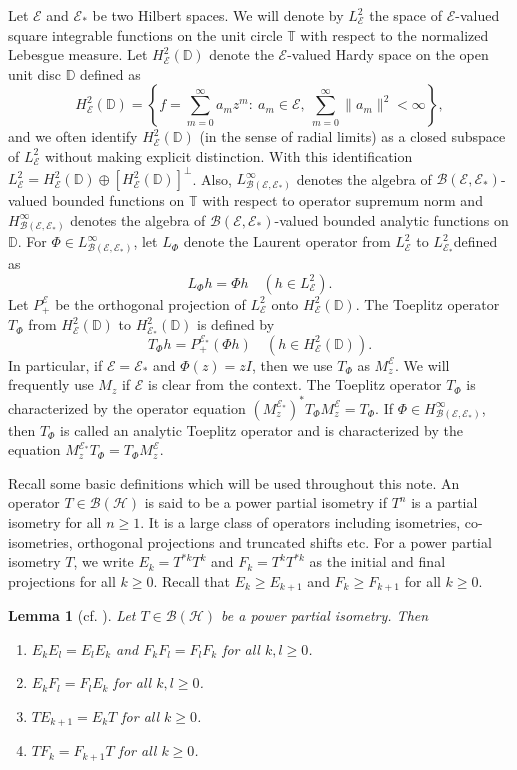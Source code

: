 \documentclass[12pt]{amsart}
\newcommand{\clb}{\mathcal{B}}
\newcommand{\cle}{\mathcal{E}}
\newcommand{\D}{\mathbb{D}}
\newcommand{\T}{\mathbb{T}}
\theoremstyle{definition}
\theoremstyle{plain}
\newtheorem{lem}[thm]{Lemma}
\theoremstyle{definition}
\numberwithin{equation}{section}
\begin{document}
Let $\cle$ and $\cle_*$ be two Hilbert spaces. We will denote by $L^2_\cle$  the space of $\cle$-valued square integrable functions on the unit circle $\T$ with respect to the normalized Lebesgue measure. Let $H^2_{\cle}(\D)$ denote the $\cle$-valued Hardy space on the open unit disc $\D$ defined as 
\[
H^2_{\cle}(\D) = \left\{ f=\sum\limits_{m=0}^\infty a_mz^m:\ a_m \in \cle,\  \sum\limits_{m=0}^\infty \|a_m\|^2 <\infty \right\},
\]
and we often identify $H^2_{\cle}(\D)$ (in the sense of radial limits) as a closed subspace of $L^2_\cle$ without making explicit distinction. With this identification $L^2_\cle = H^2_{\cle}(\D) \oplus [H^2_{\cle}(\D)]^{\perp}$. 
Also, $L^\infty_{\clb(\cle,\cle_*)}$  denotes  the algebra of $\clb(\cle,\cle_*)$-valued  bounded functions on $\T$ with respect to operator supremum norm and $H^\infty_{\clb(\cle,\cle_*)}$ denotes the algebra of $\clb(\cle,\cle_*)$-valued bounded analytic functions on $\D$. For $\Phi \in L^\infty_{\clb(\cle,\cle_*)}$, let $L_\Phi$ denote the  Laurent operator  from $L^2_\cle$ to $L^2_{\cle_*}$defined as
\[
L_\Phi h= \Phi h \quad (h \in L^2_\cle).
\]
Let $P_+^{\cle}$ be the orthogonal projection of $L^2_\cle$ onto $H^2_\cle(\D)$. The Toeplitz operator $T_\Phi$ from $H^2_\cle(\D)$ to $H^2_{\cle_*}(\D)$ is defined by 
\[
T_\Phi h=P_+^{\cle_*}(\Phi h) \quad (h \in H^2_\cle(\D)).
\]
In particular, if $\cle=\cle_*$ and $\Phi(z) =zI$, then we use $T_\Phi$ as $M_z^\cle$. We will frequently use $M_z$ if $\cle$ is clear from the context. The Toeplitz  operator $T_\Phi$ is characterized by the operator equation $(M_z^{\cle_*})^*T_\Phi M_z^\cle=T_\Phi$. If $\Phi \in H^\infty_{\clb(\cle,\cle_*)}$, then $T_\Phi$ is called an analytic Toeplitz operator and is characterized by the equation $M_z^{\cle_*} T_\Phi=T_\Phi M_z^\cle$. 



Recall some basic definitions which will be used throughout this note.
An operator $T \in \mathcal{B(H)}$ is said to be a power partial isometry if $T^n$ is a partial isometry for all $n \geq 1$. It is a large class of operators including isometries, co-isometries, orthogonal projections and truncated shifts etc. For a  power partial isometry $T$, we write $E_k=T^{*k}T^k$ and $F_k=T^kT^{*k}$ as the initial and final projections for all $k \geq 0$. Recall that  $E_k \geq E_{k+1}$ and $F_k  \geq F_{k+1}$ for all $k \geq 0$. 

\begin{lem}[cf. \cite{halmospowers}] \label{powerpartial-lem1}
Let $T \in \mathcal{B(H)}$ be a power partial isometry. Then
\begin{enumerate}
\item $E_kE_l=E_lE_k$ and  $F_kF_l=F_lF_k$  for all $k,l \geq 0$.
\item $E_kF_l=F_lE_k$ for all $k,l \geq 0$.
\item $TE_{k+1}=E_{k}T$ for all $k \geq 0$.
\item $TF_{k}=F_{k+1}T$ for all $k \geq 0$.
\end{enumerate}
\end{lem}
\end{document}
